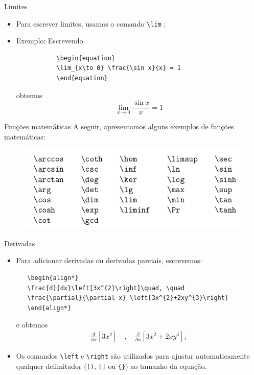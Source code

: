 \documentclass[c]{beamer}
\begin{document}
{\begin{frame}[fragile]{\sc Limites}
	\begin{itemize}
		\setlength\itemsep{0.3cm}
	   \item Para escrever {\color{blue} limites}, usamos o comando
	   \verb|\lim| ;
	   \item Exemplo: Escrevendo
	   \begin{verbatim}
	   	   \begin{equation}
	   	   \lim_{x\to 0} \frac{\sin x}{x} = 1
	   	   \end{equation}
	   \end{verbatim}
	   obtemos
	   \begin{equation}
	   \lim_{x\to 0} \frac{\sin x}{x} = 1
	   \end{equation}
	\end{itemize}
\end{frame}

\begin{frame}[fragile]{\sc Funções matemáticas}
A seguir, apresentamos alguns exemplos de {\color{blue} funções matemáticas}:
	\begin{figure}
		\centering
		\includegraphics[scale=0.5]{images/math_forms}
	\end{figure}
\end{frame}



\begin{frame}[fragile]{\sc Derivadas}
	\begin{itemize}
		\setlength\itemsep{0.3cm}
   \item Para adicionar {\color{blue} derivadas} ou {\color{blue} derivadas parciais}, escrevemos:
\begin{verbatim}
   \begin{align*}
   \frac{d}{dx}\left[3x^{2}\right]\quad, \quad
   \frac{\partial}{\partial x} \left[3x^{2}+2xy^{3}\right]
   \end{align*}
\end{verbatim}
   e obtemos
   \begin{align*}
   \frac{d}{dx}\left[3x^{2}\right]\quad, \quad
   \frac{\partial}{\partial x} \left[3x^{2}+2xy^{3}\right];
   \end{align*}
   \item Os comandos \verb|\left| e \verb|\right| são utilizados para {\color{blue} ajustar} 
   automaticamente qualquer {\color{blue} delimitador} (\verb|()|, \verb|[]| ou \verb|{}|) 
   ao {\color{blue} tamanho da equação}.
	\end{itemize}
\end{frame}



}
\end{document}
